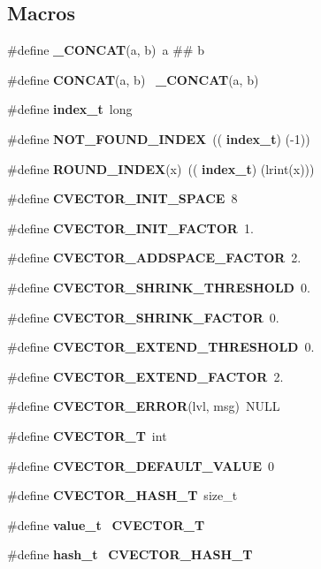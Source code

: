 \subsection*{Macros}
\begin{DoxyCompactItemize}
\item 
\#define \textbf{ \+\_\+\+C\+O\+N\+C\+AT}(a,  b)~a \#\# b
\item 
\#define \textbf{ C\+O\+N\+C\+AT}(a,  b)~\textbf{ \+\_\+\+C\+O\+N\+C\+AT}(a, b)
\item 
\#define \textbf{ index\+\_\+t}~long
\item 
\#define \textbf{ N\+O\+T\+\_\+\+F\+O\+U\+N\+D\+\_\+\+I\+N\+D\+EX}~((\textbf{ index\+\_\+t}) (-\/1))
\item 
\#define \textbf{ R\+O\+U\+N\+D\+\_\+\+I\+N\+D\+EX}(x)~((\textbf{ index\+\_\+t}) (lrint(x)))
\item 
\#define \textbf{ C\+V\+E\+C\+T\+O\+R\+\_\+\+I\+N\+I\+T\+\_\+\+S\+P\+A\+CE}~8
\item 
\#define \textbf{ C\+V\+E\+C\+T\+O\+R\+\_\+\+I\+N\+I\+T\+\_\+\+F\+A\+C\+T\+OR}~1.
\item 
\#define \textbf{ C\+V\+E\+C\+T\+O\+R\+\_\+\+A\+D\+D\+S\+P\+A\+C\+E\+\_\+\+F\+A\+C\+T\+OR}~2.
\item 
\#define \textbf{ C\+V\+E\+C\+T\+O\+R\+\_\+\+S\+H\+R\+I\+N\+K\+\_\+\+T\+H\+R\+E\+S\+H\+O\+LD}~0.
\item 
\#define \textbf{ C\+V\+E\+C\+T\+O\+R\+\_\+\+S\+H\+R\+I\+N\+K\+\_\+\+F\+A\+C\+T\+OR}~0.
\item 
\#define \textbf{ C\+V\+E\+C\+T\+O\+R\+\_\+\+E\+X\+T\+E\+N\+D\+\_\+\+T\+H\+R\+E\+S\+H\+O\+LD}~0.
\item 
\#define \textbf{ C\+V\+E\+C\+T\+O\+R\+\_\+\+E\+X\+T\+E\+N\+D\+\_\+\+F\+A\+C\+T\+OR}~2.
\item 
\#define \textbf{ C\+V\+E\+C\+T\+O\+R\+\_\+\+E\+R\+R\+OR}(lvl,  msg)~N\+U\+LL
\item 
\#define \textbf{ C\+V\+E\+C\+T\+O\+R\+\_\+T}~int
\item 
\#define \textbf{ C\+V\+E\+C\+T\+O\+R\+\_\+\+D\+E\+F\+A\+U\+L\+T\+\_\+\+V\+A\+L\+UE}~0
\item 
\#define \textbf{ C\+V\+E\+C\+T\+O\+R\+\_\+\+H\+A\+S\+H\+\_\+T}~size\+\_\+t
\item 
\#define \textbf{ value\+\_\+t}~\textbf{ C\+V\+E\+C\+T\+O\+R\+\_\+T}
\item 
\#define \textbf{ hash\+\_\+t}~\textbf{ C\+V\+E\+C\+T\+O\+R\+\_\+\+H\+A\+S\+H\+\_\+T}
\item 

\end{DoxyCompactItemize}
